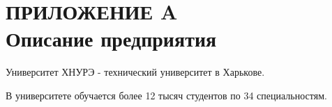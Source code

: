 \section*{ПРИЛОЖЕНИЕ A \\
	Описание предприятия }


\vspace{1\baselineskip} 

Университет ХНУРЭ - технический университет в Харькове. 


В университете обучается более 12 тысяч студентов по 34 специальностям.

